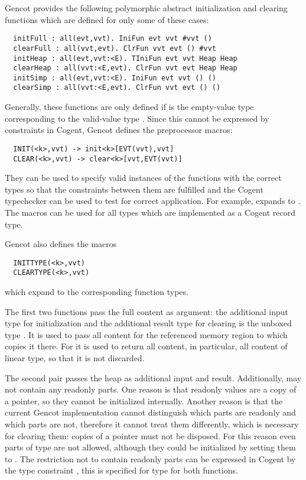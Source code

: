 Gencot provides the following polymorphic abstract initialization and clearing functions which are defined for only 
some of these cases:
\begin{verbatim}
  initFull : all(evt,vvt). IniFun evt vvt #vvt ()
  clearFull : all(vvt,evt). ClrFun vvt evt () #vvt
  initHeap : all(evt,vvt:<E). TIniFun evt vvt Heap Heap
  clearHeap : all(vvt:<E,evt). ClrFun vvt evt Heap Heap
  initSimp : all(evt,vvt:<E). IniFun evt vvt () ()
  clearSimp : all(vvt:<E,evt). ClrFun vvt evt () ()
\end{verbatim}
Generally, these functions are only defined if  is the empty-value type corresponding to the valid-value
type . Since this cannot be expressed by constraints in Cogent, Gencot defines the preprocessor macros:
\begin{verbatim}
  INIT(<k>,vvt) -> init<k>[EVT(vvt),vvt]
  CLEAR(<k>,vvt) -> clear<k>[vvt,EVT(vvt)]
\end{verbatim}
They can be used to specify valid instances of the functions with the correct types so that the constraints
between them are fulfilled and the Cogent typechecker can be used to test for correct application.
For example,  expands to . The macros can be used for 
all types  which are implemented as a Cogent record type.

Gencot also defines the macros
\begin{verbatim}
  INITTYPE(<k>,vvt)
  CLEARTYPE(<k>,vvt)
\end{verbatim}
which expand to the corresponding function types.

The first two functions pass the full content as argument: the additional input type for initialization and the additional
result type for clearing is the
unboxed type . It is used to pass all content for the referenced memory region to  which
copies it there. For  it is used to return all content, in particular, all content of linear type, so that 
it is not discarded.

The second pair passes the heap as additional input and result. Additionally, 
may not contain any readonly parts. One reason is that readonly values are a copy of a pointer, so they 
cannot be initialized internally. Another reason is that the current Gencot implementation cannot distinguish which 
parts are readonly and which parts are not, therefore it cannot treat them differently, which is necessary for 
clearing them: copies of a pointer must not be disposed. For this reason even parts of type  are
not allowed, although they could be initialized by setting them to . 
The restriction not to contain readonly parts can be expressed
in Cogent by the type constraint , this is specified for type  for both functions.

